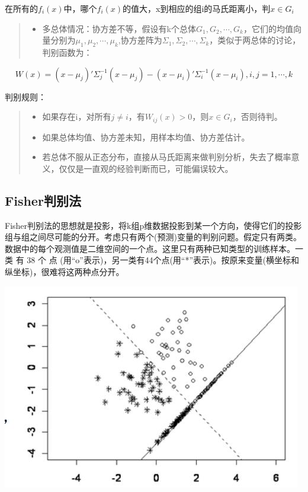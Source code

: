 \documentclass[]{ctexbook}
\providecommand{\tightlist}{%
  \setlength{\itemsep}{0pt}\setlength{\parskip}{0pt}}
\begin{document}
在所有的\(f_i(x)\)中，哪个\(f_i(x)\)的值大，x到相应的组i的马氏距离小，判\(x\in G_i\)

\begin{quote}
\begin{itemize}
\tightlist
\item
  多总体情况：协方差不等，假设有k个总体\(G_1,G_2,\cdots,G_k\)，它们的均值向量分别为\(\mu_1,\mu_2,\cdots,\mu_k\),协方差阵为\(\Sigma_1,\Sigma_2,\cdots,\Sigma_k\)，类似于两总体的讨论，判别函数为：
\end{itemize}
\end{quote}

\[W(x)=(x-\mu_j)'\Sigma_j^{-1}(x-\mu_j)-(x-\mu_i)'\Sigma_i^{-1}(x-\mu_i),i,j=1,\cdots,k\]

判别规则：

\begin{quote}
\begin{itemize}
\tightlist
\item
  如果存在i，对所有\(j\neq i\)，有\(W_{ij}(x)>0\)，则\(x\in G_i\)，否则待判。
\item
  如果总体均值、协方差未知，用样本均值、协方差估计。
\item
  若总体不服从正态分布，直接从马氏距离来做判别分析，失去了概率意义，仅仅是一直观的经验判断而已，可能偏误较大。
\end{itemize}
\end{quote}

\hypertarget{fisherux5224ux522bux6cd5}{%
\subsection{Fisher判别法}\label{fisherux5224ux522bux6cd5}}

Fisher判别法的思想就是投影，将k组p维数据投影到某一个方向，使得它们的投影组与组之间尽可能的分开。考虑只有两个(预测)变量的判别问题。假定只有两类。数据中的每个观测值是二维空间的一个点。这里只有两种已知类型的训练样本。一 类 有 38 个 点 (用``o''表示)，另一类有44个点(用``*''表示)。按原来变量(横坐标和纵坐标)，很难将这两种点分开。

\includegraphics[width=0.8\linewidth,height=0.4\textheight]{fig/fig28}
\end{document}
